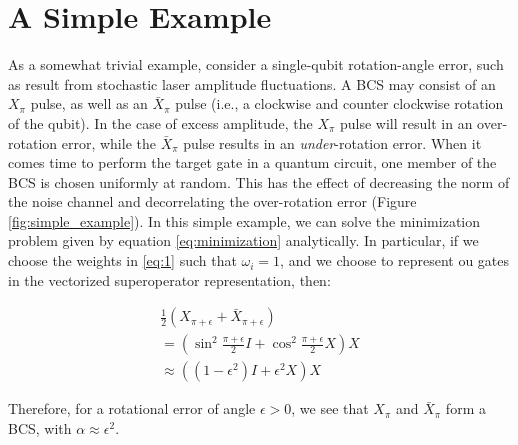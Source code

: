 \documentclass[aps,nofootinbib,pra,notitlepage,twocolumn]{revtex4-1}
\begin{document}
\section{A Simple Example}
As a somewhat trivial example, consider a single-qubit rotation-angle error, such as result from stochastic laser amplitude fluctuations. A BCS may consist of an $X_\pi$ pulse, as well as an $\bar X_\pi$ pulse (i.e., a clockwise and counter clockwise rotation of the qubit). In the case of excess amplitude, the $X_\pi$ pulse will result in an over-rotation error, while the $\bar X_\pi$ pulse results in an \emph{under}-rotation error. When it comes time to perform the target gate in a quantum circuit, one member of the BCS is chosen uniformly at random. This has the effect of decreasing the norm of the noise channel and decorrelating the over-rotation error (Figure \ref{fig:simple_example}). In this simple example, we can solve the minimization problem given by equation \ref{eq:minimization} analytically. In particular, if we choose the weights in \ref{eq:1} such that $\omega_i=1$, and we choose to represent ou gates in the vectorized superoperator representation, then:

\begin{equation}
  \begin{gathered}
    \frac{1}{2}(X_{\pi + \epsilon} + \bar X_{\pi + \epsilon}) \\  
    = (\sin^2{\frac{\pi + \epsilon}{2}}I + \cos^2{\frac{\pi + \epsilon}{2}}X)X \\
    \approx ((1 - \epsilon^2)I + \epsilon^2X)X
  \end{gathered}
\end{equation}
 
Therefore, for a rotational error of angle $\epsilon > 0$, we see that $X_\pi$ and  $\bar X_\pi$  form a BCS, with $\alpha\approx\epsilon^2$.
\end{document}
